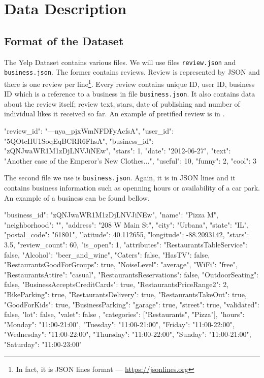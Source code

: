 \appendix
\addappheadtotoc
\chapter{Data Description}
\label{app:a}


\section{Format of the Dataset}
\label{sec:format}

The Yelp Dataset contains various files.
We will use files \texttt{review.json} and \texttt{business.json}.
The former contains reviews.
Review is represented by JSON and there is one review per line\footnote{In fact, it is JSON lines format --- \url{https://jsonlines.org}}.
Every review contains unique ID, user ID, business ID which is a reference to a business in file \texttt{business.json}.
It also contains data about the review itself; review text, stars, date of publishing and number of individual likes it received so far.
An example of pretified review is in .

\begin{code}
{
	"review_id": "---nya_pjxWmNFDFyAcfsA",
	"user_id": "5QOtcHU1SoqEqBCRR6FhsA",
	"business_id": "zQNJwaWR1M1zDjLNVJiNEw",
	"stars": 1,
	"date": "2012-06-27",
	"text": "Another case of the Emperor's New Clothes...",
	"useful": 10,
	"funny": 2,
	"cool": 3
}
\end{code}

The second file we use is \texttt{business.json}.
Again, it is in JSON lines and it contains business information such as openning hours or availability of a car park.
An example of a business can be found bellow.

\begin{code}
{
	"business_id": "zQNJwaWR1M1zDjLNVJiNEw",
	"name": "Pizza M",
	"neighborhood": "",
	"address": "208 W Main St",
	"city": "Urbana",
	"state": "IL",
	"postal_code": "61801",
	"latitude": 40.112655,
	"longitude": -88.2093142,
	"stars": 3.5,
	"review_count": 60,
	"is_open": 1,
	"attributes": {
		"RestaurantsTableService": false,
		"Alcohol": "beer_and_wine",
		"Caters": false,
		"HasTV": false,
		"RestaurantsGoodForGroups": true,
		"NoiseLevel": "average",
		"WiFi": "free",
		"RestaurantsAttire": "casual",
		"RestaurantsReservations": false,
		"OutdoorSeating": false,
		"BusinessAcceptsCreditCards": true,
		"RestaurantsPriceRange2": 2,
		"BikeParking": true,
		"RestaurantsDelivery": true,
		"RestaurantsTakeOut": true,
		"GoodForKids": true,
		"BusinessParking": {
			"garage": true,
			"street": true,
			"validated": false,
			"lot": false,
			"valet": false
		}
	},
	"categories": ["Restaurants", "Pizza"],
	"hours": {
		"Monday": "11:00-21:00",
		"Tuesday": "11:00-21:00",
		"Friday": "11:00-22:00",
		"Wednesday": "11:00-22:00",
		"Thursday": "11:00-22:00",
		"Sunday": "11:00-21:00",
		"Saturday": "11:00-23:00"
	}
}
\end{code}

